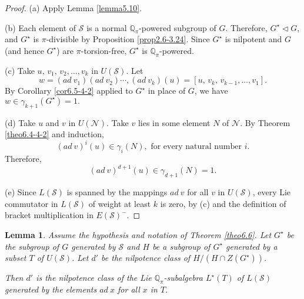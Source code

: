 \documentclass[mathscr]{amsart}
\theoremstyle{theorem}
\newtheorem{lemma}[theorem]{Lemma}
\theoremstyle{definition}
\numberwithin{equation}{section}
\def\Q{\mathbb{Q}}
\def\S{\mathcal{S}}
\begin{document}
\begin{proof}
(a) Apply Lemma \ref{lemma5.10}.

(b) Each element of $\S$ is a normal $\Q_\pi$-powered subgroup of
$G$. Therefore, $G^\star\lhd G$, and $G^\star$ is $\pi$-divisible by
Proposition \ref{prop2.6-3.24}. Since $G^\star$ is nilpotent and $G$
(and hence $G^\star$) are $\pi$-torsion-free, $G^\star$ is
$\Q_\pi$-powered.

(c) Take $u,\,v_1,\,v_2,\dots,v_k$ in $U(\S)$. Let
$$w=(ad\ v_1)(ad\ v_2)\cdots,(ad\ v_k)(u)=[u,\,v_k,\,v_{k-1},\dots,v_1].$$
By Corollary \ref{cor6.5-4-2} applied to $G^\star$ in place of $G$,
we have $w\in\gamma_{k+1}(G^\star)=1.$

(d) Take $u$ and $v$ in $U(\mathcal{N})$. Take $v$ lies in some
element $N$ of $\mathcal{N}$. By Theorem \ref{theo6.4-4-2} and
induction,
$$(ad\ v)^i(u)\in\gamma_i(N),\text{ for every natural number }i.$$
Therefore,
$$(ad\ v)^{d+1}(u)\in\gamma_{d+1}(N)=1.$$

(e) Since $L(\S)$ is spanned by the mappings $ad\ v$ for all $v$ in
$U(\S)$, every Lie commutator in $L(\S)$ of weight at least $k$ is
zero, by (c) and the definition of bracket multiplication in
$E(\S)^-.$
\end{proof}

\begin{lemma}\label{lemma6.8}
Assume the hypothesis and notation of Theorem \ref{theo6.6}. Let
$G^\star$ be the subgroup of $G$ generated by $\S$ and $H$ be a
subgroup of $G^\star$ generated by a subset $T$ of $U(\S)$. Let $d'$
be the nilpotence class of $H/(H\cap Z(G^\star)).$

Then $d'$ is the nilpotence class of the Lie $\Q_\pi$-subalgebra
$L^\star(T)$ of $L(\S)$ generated by the elements $ad\ x$ for all
$x$ in $T.$
\end{lemma}
\end{document}
